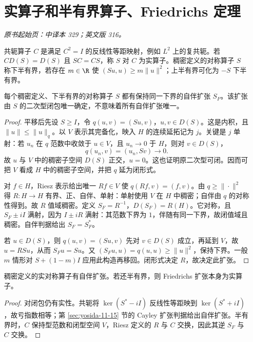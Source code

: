 \section{实算子和半有界算子、Friedrichs 定理}\label{sec:yosida-11-07}
\noindent\textit{原书起始页：中译本 329；英文版 316。}

\begin{definition}[实性与半有界性]
共轭算子 $C$ 是满足 $C^2=I$ 的反线性等距映射，例如 $L^2$ 上的复共轭。若 $CD(S)=D(S)$ 且 $SC=CS$，称 $S$ 对 $C$ 为实算子。稠密定义的对称算子 $S$ 称下半有界，若存在 $m\in\R$ 使 $(Su,u)\ge m\|u\|^2$；上半有界可化为 $-S$ 下半有界。
\end{definition}

\begin{theorem}[Friedrichs 扩张]\label{thm:y11-friedrichs}
每个稠密定义、下半有界的对称算子 $S$ 都有保持同一下界的自伴扩张 $S_F$。该扩张由 $S$ 的二次型闭包唯一确定，不意味着所有自伴扩张唯一。
\end{theorem}
\begin{proof}
平移后先设 $S\ge I$，令 $q(u,v)=(Su,v)$，$u,v\in D(S)$。这是内积，且 $\|u\|\le\|u\|_q$。以 $V$ 表示其完备化，映入 $H$ 的连续延拓记为 $j$。关键是 $j$ 单射：若 $u_n$ 在 $q$ 范数中收敛于 $u\in V$，且 $u_n\to0$ 于 $H$，则对 $v\in D(S)$，
\[
 q(u_n,v)=(u_n,Sv)\longrightarrow0.
\]
故 $u$ 与 $V$ 中的稠密子空间 $D(S)$ 正交，$u=0$。这也证明原二次型可闭。因而可把 $V$ 看成 $H$ 中的稠密子空间，并把 $q$ 延为闭形式。

对 $f\in H$，Riesz 表示给出唯一 $Rf\in V$ 使 $q(Rf,v)=(f,v)$。由 $q\ge\|\cdot\|^2$ 得 $R:H\to H$ 有界、正、自伴、单射：单射使用 $V$ 在 $H$ 中稠密；自伴由 $q$ 的对称性得到。故 $R$ 值域稠密。定义 $S_F=R^{-1}$，$D(S_F)=R(H)$。它对称，且 $S_F\pm iI$ 满射，因为 $I\pm iR$ 满射：其范数下界为 $1$，伴随有同一下界，故闭值域且稠密。自伴判据给出 $S_F=S_F^*$。

若 $u\in D(S)$，则 $q(u,v)=(Su,v)$ 先对 $v\in D(S)$ 成立，再延到 $V$，故 $u=RSu$，从而 $S_Fu=Su$。又 $(S_Fu,u)=q(u,u)\ge\|u\|^2$，保持下界。一般 $m$ 情形对 $S+(1-m)I$ 应用此构造再移回。闭形式决定 $R$，故决定此扩张。
\end{proof}

\begin{proposition}[实算子的扩张]
稠密定义的实对称算子有自伴扩张。若还半有界，则 Friedrichs 扩张本身为实算子。
\end{proposition}
\begin{proof}
对闭包仍有实性。共轭将 $\ker(S^*-iI)$ 反线性等距映到 $\ker(S^*+iI)$，故亏指数相等；第 \ref{sec:yosida-11-15} 节的 Cayley 扩张判据给出自伴扩张。半有界时，$C$ 保持型范数和闭型空间 $V$，Riesz 定义的 $R$ 与 $C$ 交换，因此其逆 $S_F$ 与 $C$ 交换。
\end{proof}

